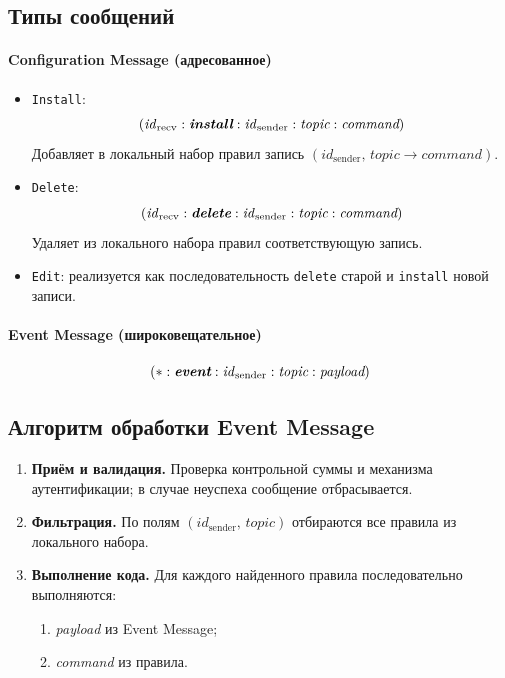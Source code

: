 \documentclass[14pt, a4paper]{extreport}
\begin{document}
\subsection{Типы сообщений}

\paragraph{Configuration Message (адресованное)}
\begin{itemize}
  \item \texttt{Install}: 
  \[ (\mathit{id}_{\mathrm{recv}} :  \textit{\textbf{install}} : \mathit{id}_{\mathrm{sender}} : \textit{topic} : \textit{command}) \]
  Добавляет в локальный набор правил запись \((\mathit{id}_{\mathrm{sender}},\,\textit{topic}\to\textit{command})\).

  \item \texttt{Delete}: 
  \[ (\mathit{id}_{\mathrm{recv}} : \textit{\textbf{delete}} : \mathit{id}_{\mathrm{sender}} : \textit{topic} : \textit{command}) \]
  Удаляет из локального набора правил соответствующую запись.

  \item \texttt{Edit}: реализуется как последовательность \texttt{delete} старой и \texttt{install} новой записи.
\end{itemize}

\paragraph{Event Message (широковещательное)}
\[
(* : \textit{\textbf{event}} : \mathit{id}_{\mathrm{sender}} : \textit{topic} : \textit{payload})
\]


\subsection{Алгоритм обработки Event Message}

\begin{enumerate}
  \item \textbf{Приём и валидация.} Проверка контрольной суммы и механизма аутентификации; в случае неуспеха сообщение отбрасывается.
  \item \textbf{Фильтрация.} По полям $(\mathit{id}_{\mathrm{sender}},\,\textit{topic})$ отбираются все правила из локального набора.
  \item \textbf{Выполнение кода.} Для каждого найденного правила последовательно выполняются:
    \begin{enumerate}
      \item \textit{payload} из Event Message;
      \item \textit{command} из правила.
    \end{enumerate}
\end{enumerate}
\end{document}
